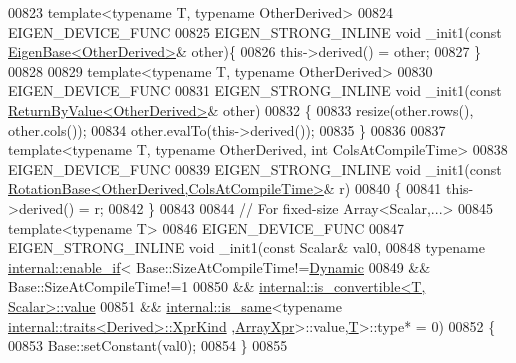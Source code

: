 \begin{DoxyCode}
00823     \textcolor{keyword}{template}<\textcolor{keyword}{typename} T, \textcolor{keyword}{typename} OtherDerived>
00824     EIGEN\_DEVICE\_FUNC
00825     EIGEN\_STRONG\_INLINE \textcolor{keywordtype}{void} \_init1(\textcolor{keyword}{const} \hyperlink{group___core___module_struct_eigen_1_1_eigen_base}{EigenBase<OtherDerived>}& other)\{
00826       this->derived() = other;
00827     \}
00828 
00829     \textcolor{keyword}{template}<\textcolor{keyword}{typename} T, \textcolor{keyword}{typename} OtherDerived>
00830     EIGEN\_DEVICE\_FUNC
00831     EIGEN\_STRONG\_INLINE \textcolor{keywordtype}{void} \_init1(\textcolor{keyword}{const} \hyperlink{group___core___module_class_eigen_1_1_return_by_value}{ReturnByValue<OtherDerived>}& other)
00832     \{
00833       resize(other.rows(), other.cols());
00834       other.evalTo(this->derived());
00835     \}
00836 
00837     \textcolor{keyword}{template}<\textcolor{keyword}{typename} T, \textcolor{keyword}{typename} OtherDerived, \textcolor{keywordtype}{int} ColsAtCompileTime>
00838     EIGEN\_DEVICE\_FUNC
00839     EIGEN\_STRONG\_INLINE \textcolor{keywordtype}{void} \_init1(\textcolor{keyword}{const} 
      \hyperlink{class_eigen_1_1_rotation_base}{RotationBase<OtherDerived,ColsAtCompileTime>}& r)
00840     \{
00841       this->derived() = r;
00842     \}
00843     
00844     \textcolor{comment}{// For fixed-size Array<Scalar,...>}
00845     \textcolor{keyword}{template}<\textcolor{keyword}{typename} T>
00846     EIGEN\_DEVICE\_FUNC
00847     EIGEN\_STRONG\_INLINE \textcolor{keywordtype}{void} \_init1(\textcolor{keyword}{const} Scalar& val0,
00848                                     \textcolor{keyword}{typename} \hyperlink{struct_eigen_1_1internal_1_1enable__if}{internal::enable\_if}<    
      Base::SizeAtCompileTime!=\hyperlink{namespace_eigen_ad81fa7195215a0ce30017dfac309f0b2}{Dynamic}
00849                                                                   && Base::SizeAtCompileTime!=1
00850                                                                   && 
      \hyperlink{struct_eigen_1_1internal_1_1is__convertible}{internal::is\_convertible<T, Scalar>::value}
00851                                                                   && 
      \hyperlink{struct_eigen_1_1internal_1_1is__same}{internal::is\_same}<\textcolor{keyword}{typename} \hyperlink{struct_eigen_1_1internal_1_1traits}{internal::traits<Derived>::XprKind}
      ,\hyperlink{struct_eigen_1_1_array_xpr}{ArrayXpr}>::value,\hyperlink{group___sparse_core___module}{T}>::type* = 0)
00852     \{
00853       Base::setConstant(val0);
00854     \}
00855     

\end{DoxyCode}
